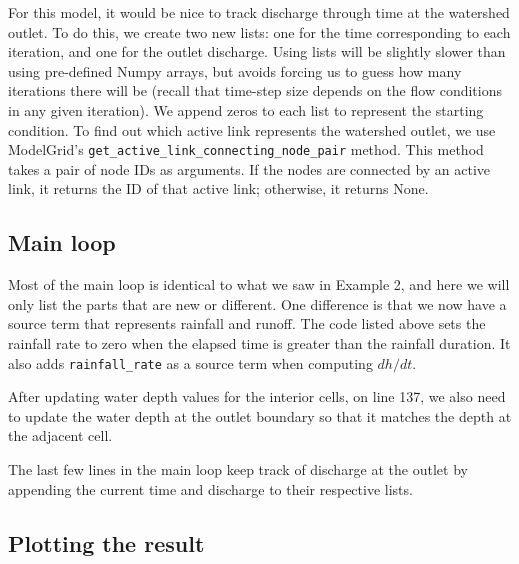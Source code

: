 \documentclass[12pt]{article}
\newcommand{\code}[1]{{\tt #1}}
\begin{document}


For this model, it would be nice to track discharge through time at the watershed outlet. To do this, we create two new lists: one for the time corresponding to each iteration, and one for the outlet discharge. Using lists will be slightly slower than using pre-defined Numpy arrays, but avoids forcing us to guess how many iterations there will be (recall that time-step size depends on the flow conditions in any given iteration). We append zeros to each list to represent the starting condition. To find out which active link represents the watershed outlet, we use ModelGrid's \code{get\_active\_link\_connecting\_node\_pair} method. This method takes a pair of node IDs as arguments. If the nodes are connected by an active link, it returns the ID of that active link; otherwise, it returns None.

\subsection{Main loop}



Most of the main loop is identical to what we saw in Example 2, and here we will only list the parts that are new or different. One difference is that we now have a source term that represents rainfall and runoff. The code listed above sets the rainfall rate to zero when the elapsed time is greater than the rainfall duration. It also adds \code{rainfall\_rate} as a source term when computing $dh/dt$.



After updating water depth values for the interior cells, on line 137, we also need to update the water depth at the outlet boundary so that it matches the depth at the adjacent cell.



The last few lines in the main loop keep track of discharge at the outlet by appending the current time and discharge to their respective lists.

\subsection{Plotting the result}
\end{document}
